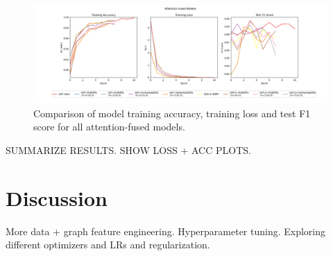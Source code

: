 \documentclass[letterpaper]{article} %
\begin{document}
\begin{figure}
    \includegraphics[width=\linewidth]{all_joint.png}
    \caption{Comparison of model training accuracy, training loss and test F1 score for all attention-fused models.}
\end{figure}

SUMMARIZE RESULTS. SHOW LOSS + ACC PLOTS.

\section{Discussion}

More data + graph feature engineering. Hyperparameter tuning. Exploring different optimizers and LRs and regularization.

\appendix


\end{document}
